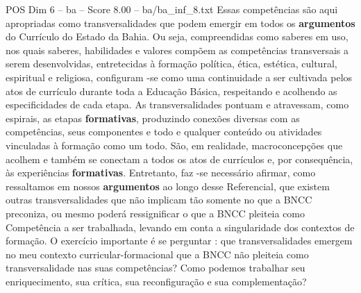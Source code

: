 \begin{textsample}{POS Dim 6 – ba – Score 8.00 – ba/ba\_inf\_8.txt}
Essas competências são aqui apropriadas como transversalidades que podem emergir em todos os \textbf{argumentos} do Currículo do Estado da Bahia.
Ou seja, compreendidas como saberes em uso, nos quais saberes, habilidades e valores compõem as competências transversais a serem desenvolvidas, entretecidas à formação política, ética, estética, cultural, espiritual e religiosa, configuram -se como uma continuidade a ser cultivada pelos atos de currículo durante toda a Educação Básica, respeitando e acolhendo as especificidades de cada etapa.
As transversalidades pontuam e atravessam, como espirais, as etapas \textbf{formativas}, produzindo conexões diversas com as competências, seus componentes e todo e qualquer conteúdo ou atividades vinculadas à formação como um todo.
São, em realidade, macroconcepções que acolhem e também se conectam a todos os atos de currículos e, por consequência, às experiências \textbf{formativas}.
Entretanto, faz -se necessário afirmar, como ressaltamos em nossos \textbf{argumentos} ao longo desse Referencial, que existem outras transversalidades que não implicam tão somente no que a BNCC preconiza, ou mesmo poderá ressignificar o que a BNCC pleiteia como Competência a ser trabalhada, levando em conta a singularidade dos contextos de formação.
O exercício importante é se perguntar : que transversalidades emergem no meu contexto curricular-formacional que a BNCC não pleiteia como transversalidade nas suas competências?
Como podemos trabalhar seu enriquecimento, sua crítica, sua reconfiguração e sua complementação?

\end{textsample}
